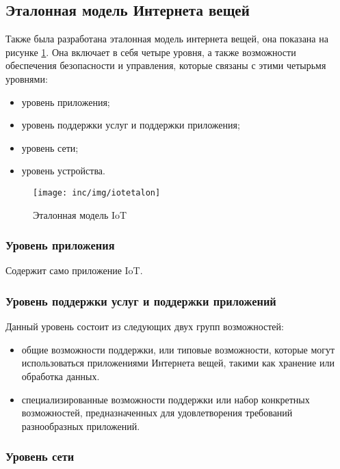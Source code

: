 \subsection{Эталонная модель Интернета вещей}

Также была разработана эталонная модель интернета вещей, она показана на рисунке \ref{fig:iotetalon}.
Она включает в себя четыре уровня, а также возможности обеспечения безопасности и управления, которые связаны с этими четырьмя уровнями:

\begin{itemize}
	\item уровень приложения;
	\item уровень поддержки услуг и поддержки приложения;
	\item уровень сети;
	\item уровень устройства.
\end{itemize}

\begin{figure}
  \centering
  \texttt{[image: inc/img/iotetalon]}
	\caption{Эталонная модель IoT\cite{itutiot2012}}
  \label{fig:iotetalon}
\end{figure}

\subsubsection{Уровень приложения}

Содержит само приложение IoT.

\subsubsection{Уровень поддержки услуг и поддержки приложений}

Данный уровень состоит из следующих двух групп возможностей:

\begin{itemize}
	\item общие возможности поддержки, или типовые возможности, которые могут использоваться приложениями Интернета вещей, такими как хранение или обработка данных.
	\item специализированные возможности поддержки или набор конкретных возможностей, предназначенных для удовлетворения требований разнообразных приложений.
\end{itemize}

\subsubsection{Уровень сети}


